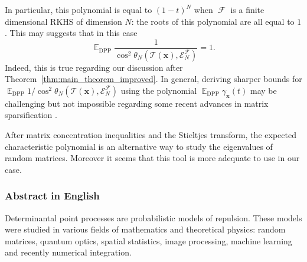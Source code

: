 \documentclass[twoside,11pt]{book}
\numberwithin{theorem}{chapter}
\numberwithin{definition}{chapter}
\numberwithin{proposition}{chapter}
\numberwithin{corollary}{chapter}
\numberwithin{example}{chapter}
\numberwithin{lemma}{chapter}
\numberwithin{assumption}{chapter}
\numberwithin{equation}{chapter}
\numberwithin{figure}{chapter}
\DeclareMathOperator{\DPP}{\mathrm{DPP}}
\DeclareMathOperator{\EX}{\mathbb{E}}
\DeclareMathOperator{\F}{\mathcal{F}}
\begin{document}
In particular, this polynomial is equal to $(1-t)^{N}$ when $\F$ is a finite dimensional RKHS of dimension $N$: the roots of this polynomial are all equal to $1$. This may suggests that in this case
\begin{equation}
\EX_{\DPP}\frac{1}{\cos^{2}\theta_{N}(\mathcal{T}(\bm{x}), \mathcal{E}_{N}^{\F})} =1.
\end{equation}
Indeed, this is true regarding our discussion after Theorem~\ref{thm:main_theorem_improved}. In general, deriving sharper bounds for $\EX_{\DPP}1 \big/ \cos^{2}\theta_{N}(\mathcal{T}(\bm{x}), \mathcal{E}_{N}^{\F})$ using the polynomial $\EX_{\DPP} \gamma_{\bm{x}}(t)$ may be challenging but not impossible regarding some recent advances in matrix sparsification \citep*{MaSpSr15}. 

After matrix concentration inequalities and the Stieltjes transform, the expected characteristic polynomial is an alternative way to study the eigenvalues of random matrices. Moreover it seems that this tool is more adequate to use in our case.









\clearpage

\subsubsection{Abstract in English}

Determinantal point processes are probabilistic models of repulsion. 
These models were studied in various fields of mathematics and theoretical physics: random matrices, quantum optics, spatial statistics, image processing, machine learning and recently numerical integration.
\end{document}
